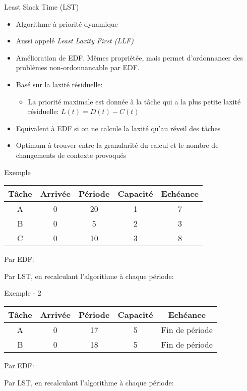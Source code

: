 \begin{frame}{Least Slack Time (LST)} 
  \begin{itemize}
  \item Algorithme à priorité dynamique
  \item Aussi appelé \emph{Least Laxity First (LLF)}
  \item   Amélioration   de  EDF.   Mêmes   propriétée,  mais   permet
    d'ordonnancer des problèmes non-ordonnancable par EDF.
  \item Basé sur la laxité résiduelle: 
    \begin{itemize}
    \item La  priorité maximale est  donnée à la  tâche qui a  la plus
      petite laxité résiduelle: $L(t) = D(t) - C(t)$
    \end{itemize}
  \item Equivalent à  EDF si on ne calcule la  laxité qu'au réveil des
    tâches
  \item Optimum à trouver entre  la granularité du calcul et le nombre
    de changements de  contexte provoqués 
  \end{itemize}
\end{frame}

\begin{frame}{Exemple}
  \begin{center}
    \begin{tabular}{ccccc}
      \hline
      Tâche & Arrivée & Période & Capacité & Echéance \\
      \hline
      A & 0 & 20 & 1 & 7\\
      B & 0 &  5 & 2 & 3\\
      C & 0 & 10 & 3 & 8\\
      \hline
    \end{tabular}
  \end{center}
  Par EDF:
  
  Par LST, en recalculant l'algorithme à chaque période:
  
\end{frame} 

\begin{frame}{Exemple - 2}
  \begin{center}
    \begin{tabular}{ccccc}
      \hline
      Tâche & Arrivée & Période & Capacité & Echéance \\
      \hline
      A & 0 & 17 & 5 & Fin de période\\
      B & 0 & 18 & 5 & Fin de période\\
      \hline
    \end{tabular}
  \end{center}
  Par EDF:
  
  Par LST, en recalculant l'algorithme à chaque période:
  
\end{frame} 


